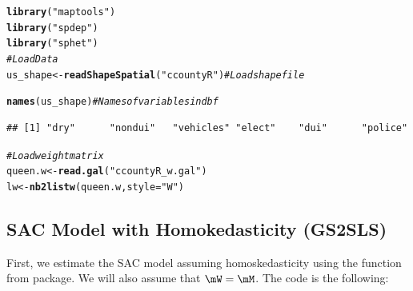 \documentclass[english,12pt]{book}\usepackage[]{graphicx}\usepackage[]{xcolor}
\makeatletter
\newcommand{\hlstr}[1]{\textcolor[rgb]{0.192,0.494,0.8}{#1}}%
\newcommand{\hlcom}[1]{\textcolor[rgb]{0.678,0.584,0.686}{\textit{#1}}}%
\newcommand{\hlstd}[1]{\textcolor[rgb]{0.345,0.345,0.345}{#1}}%
\newcommand{\hlkwb}[1]{\textcolor[rgb]{0.69,0.353,0.396}{#1}}%
\newcommand{\hlkwc}[1]{\textcolor[rgb]{0.333,0.667,0.333}{#1}}%
\newcommand{\hlkwd}[1]{\textcolor[rgb]{0.737,0.353,0.396}{\textbf{#1}}}%
\newenvironment{kframe}{%
 \def\at@end@of@kframe{}%
 \ifinner\ifhmode%
  \def\at@end@of@kframe{\end{minipage}}%
  \begin{minipage}{\columnwidth}%
 \fi\fi%
 \def\FrameCommand##1{\hskip\@totalleftmargin \hskip-\fboxsep
 \colorbox{shadecolor}{##1}\hskip-\fboxsep
     \hskip-\linewidth \hskip-\@totalleftmargin \hskip\columnwidth}%
 \MakeFramed {\advance\hsize-\width
   \@totalleftmargin\z@ \linewidth\hsize
   \@setminipage}}%
 {\par\unskip\endMakeFramed%
 \at@end@of@kframe}
\newenvironment{knitrout}{}{} %
\makeatother
\begin{document}
\begin{knitrout}
\color{fgcolor}\begin{kframe}
\begin{alltt}
\hlkwd{library}\hlstd{(}\hlstr{"maptools"}\hlstd{)}
\hlkwd{library}\hlstd{(}\hlstr{"spdep"}\hlstd{)}
\hlkwd{library}\hlstd{(}\hlstr{"sphet"}\hlstd{)}
\hlcom{# Load Data}
\hlstd{us_shape} \hlkwb{<-} \hlkwd{readShapeSpatial}\hlstd{(}\hlstr{"ccountyR"}\hlstd{)}  \hlcom{# Load shape file}
\end{alltt}


{\ttfamily\noindent\color{warningcolor}{\#\# Warning: shapelib support is provided by GDAL through the sf and terra packages among others}}

{\ttfamily\noindent\color{warningcolor}{\#\# Warning: shapelib support is provided by GDAL through the sf and terra paackages among others}}

{\ttfamily\noindent\color{warningcolor}{\#\# Warning: shapelib support is provided by GDAL through the sf and terra packages among others}}\begin{alltt}
\hlkwd{names}\hlstd{(us_shape)}                           \hlcom{# Names of variables in dbf}
\end{alltt}
\begin{verbatim}
## [1] "dry"      "nondui"   "vehicles" "elect"    "dui"      "police"
\end{verbatim}
\begin{alltt}
\hlcom{# Load weight matrix}
\hlstd{queen.w} \hlkwb{<-} \hlkwd{read.gal}\hlstd{(}\hlstr{"ccountyR_w.gal"}\hlstd{)}
\hlstd{lw} \hlkwb{<-} \hlkwd{nb2listw}\hlstd{(queen.w,} \hlkwc{style} \hlstd{=} \hlstr{"W"}\hlstd{)}
\end{alltt}
\end{kframe}
\end{knitrout}


\subsection{SAC Model with Homokedasticity (GS2SLS)}


First, we estimate the SAC model assuming homoskedasticity \citep{kelejian1998generalized} using the  function from  package. We will also assume that $\mW = \mM$. The code is the following:
\end{document}
